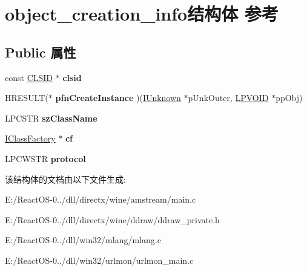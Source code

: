 \hypertarget{structobject__creation__info}{}\section{object\+\_\+creation\+\_\+info结构体 参考}
\label{structobject__creation__info}
\subsection*{Public 属性}
\begin{DoxyCompactItemize}
\item 
\mbox{\label{structobject__creation__info_a6d0e90e20f9228a203644bf78e4f6af4}} 
const \hyperlink{struct___i_i_d}{C\+L\+S\+ID} $\ast$ {\bfseries clsid}
\item 
\mbox{\label{structobject__creation__info_ac0c0e726eabd20c7ee89299cbb406dd0}} 
H\+R\+E\+S\+U\+LT($\ast$ {\bfseries pfn\+Create\+Instance} )(\hyperlink{interface_i_unknown}{I\+Unknown} $\ast$p\+Unk\+Outer, \hyperlink{interfacevoid}{L\+P\+V\+O\+ID} $\ast$pp\+Obj)
\item 
\mbox{\label{structobject__creation__info_a0205402f5f89c6c2d4690b14d9a2da3d}} 
L\+P\+C\+S\+TR {\bfseries sz\+Class\+Name}
\item 
\mbox{\label{structobject__creation__info_aba8be388f6fbacaa1ae16b5ba6795cc7}} 
\hyperlink{interface_i_class_factory}{I\+Class\+Factory} $\ast$ {\bfseries cf}
\item 
\mbox{\label{structobject__creation__info_aafaead9c6bf157404b5f05b667b4857f}} 
L\+P\+C\+W\+S\+TR {\bfseries protocol}
\end{DoxyCompactItemize}


该结构体的文档由以下文件生成\+:\begin{DoxyCompactItemize}
\item 
E\+:/\+React\+O\+S-\/0../dll/directx/wine/amstream/main.\+c\item 
E\+:/\+React\+O\+S-\/0../dll/directx/wine/ddraw/ddraw\+\_\+private.\+h\item 
E\+:/\+React\+O\+S-\/0../dll/win32/mlang/mlang.\+c\item 
E\+:/\+React\+O\+S-\/0../dll/win32/urlmon/urlmon\+\_\+main.\+c\end{DoxyCompactItemize}
